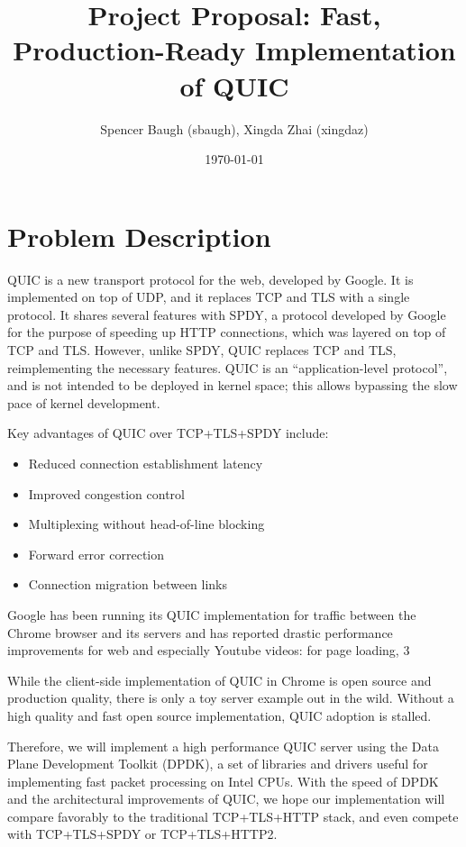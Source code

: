 \documentclass{article}
\author{Spencer Baugh (sbaugh), Xingda Zhai (xingdaz)}
\title{Project Proposal: Fast, Production-Ready Implementation of QUIC}
\date{\today}
\begin{document}
\maketitle

\section{Problem Description}

QUIC is a new transport protocol for the web, developed by Google.
It is implemented on top of UDP, and it replaces TCP and TLS with a single protocol.
It shares several features with SPDY,
a protocol developed by Google for the purpose of speeding up HTTP connections, which was layered on top of TCP and TLS.
However, unlike SPDY, QUIC replaces TCP and TLS, reimplementing the necessary features.
QUIC is an ``application-level protocol'', and is not intended to be deployed in kernel space;
this allows bypassing the slow pace of kernel development.

Key advantages of QUIC over TCP+TLS+SPDY include:
\begin{itemize}
\item Reduced connection establishment latency
\item Improved congestion control
\item Multiplexing without head-of-line blocking
\item Forward error correction
\item Connection migration between links
\end{itemize}

Google has been running its QUIC implementation for traffic between the Chrome browser and its servers
and has reported drastic performance improvements for web and especially Youtube videos:
for page loading, 3%

While the client-side implementation of QUIC in Chrome is open source and production quality,
there is only a toy server example out in the wild.
Without a high quality and fast open source implementation,
QUIC adoption is stalled.

Therefore, we will implement a high performance QUIC server
using the Data Plane Development Toolkit (DPDK),
a set of libraries and drivers useful for implementing fast packet processing on Intel CPUs.
With the speed of DPDK and the architectural improvements of QUIC,
we hope our implementation will compare favorably to the traditional TCP+TLS+HTTP stack,
and even compete with TCP+TLS+SPDY or TCP+TLS+HTTP2.
\end{document}
